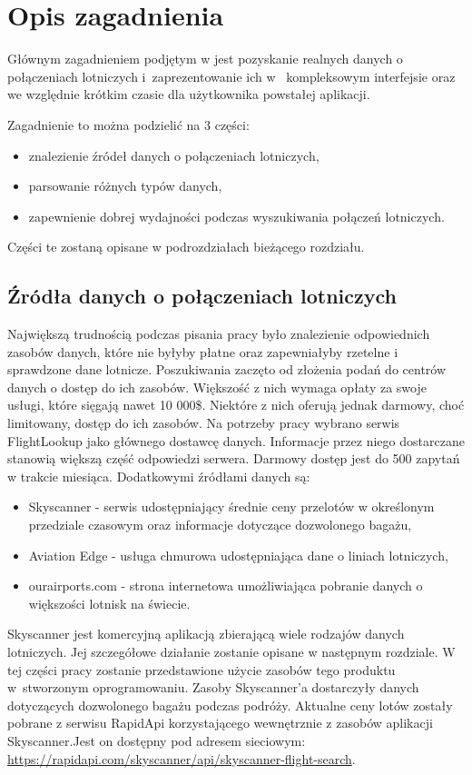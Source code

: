 \documentclass[12pt, twoside]{report}
\begin{document}
\chapter{Opis zagadnienia}
\label{chp:first}
Głównym zagadnieniem podjętym w jest pozyskanie realnych danych o połączeniach lotniczych  i~zaprezentowanie ich w~ kompleksowym interfejsie oraz we względnie krótkim czasie dla użytkownika powstałej aplikacji.

Zagadnienie to można podzielić na 3 części:
\begin{itemize}[noitemsep,topsep=0pt]
\item znalezienie źródeł danych o połączeniach lotniczych,
\item parsowanie różnych typów danych,
\item zapewnienie dobrej wydajności podczas wyszukiwania połączeń lotniczych.
\end{itemize}
Części te zostaną opisane w podrozdziałach bieżącego rozdziału.


\section{Źródła danych o połączeniach lotniczych}
Największą trudnością podczas pisania pracy było znalezienie odpowiednich zasobów danych, które nie byłyby płatne oraz zapewniałyby rzetelne i sprawdzone dane lotnicze. Poszukiwania zaczęto od złożenia podań do centrów danych o dostęp do ich zasobów. Większość z nich wymaga opłaty za swoje usługi, które sięgają nawet 10 000\$. Niektóre z nich oferują jednak darmowy, choć limitowany, dostęp do ich zasobów. Na potrzeby pracy wybrano serwis FlightLookup jako głównego dostawcę danych. Informacje przez niego dostarczane stanowią większą część odpowiedzi serwera. Darmowy dostęp jest do 500 zapytań w trakcie miesiąca.
Dodatkowymi źródłami danych są:
\begin{itemize}[noitemsep,topsep=0pt]
\item Skyscanner - serwis udostępniający średnie ceny przelotów w określonym przedziale czasowym oraz informacje dotyczące dozwolonego bagażu,
\item Aviation Edge - usługa chmurowa udostępniająca dane o liniach lotniczych,
\item ourairports.com - strona internetowa umożliwiająca pobranie danych o większości lotnisk na świecie.
\end{itemize}
Skyscanner jest komercyjną aplikacją zbierającą wiele rodzajów danych lotniczych. Jej szczegółowe działanie zostanie opisane w następnym rozdziale. W tej części pracy zostanie przedstawione użycie zasobów tego produktu w~stworzonym oprogramowaniu. Zasoby Skyscanner'a dostarczyły danych dotyczących dozwolonego bagażu podczas podróży. Aktualne ceny lotów zostały pobrane z serwisu RapidApi korzystającego wewnętrznie z zasobów aplikacji Skyscanner.Jest on dostępny pod adresem sieciowym: \url{https://rapidapi.com/skyscanner/api/skyscanner-flight-search}.
\end{document}
